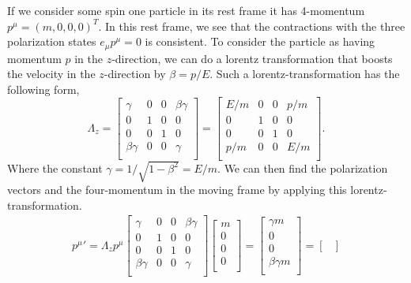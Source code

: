 \documentclass[working, oneside]{../../../Preambles/tuftebook}
\begin{document}
\begin{solution}
If we consider some spin one particle in its rest frame it has 4-momentum $p^{\mu } = \left( m, 0, 0, 0 \right) ^{T}$. In this rest frame, we see that the contractions with the three polarization states $e_{\mu }p^{\mu } = 0$ is consistent. To consider the particle as having momentum $p$ in the $z$-direction, we can do a lorentz transformation that boosts the velocity in the $z$-direction by $\beta= p /E$. Such a lorentz-transformation has the following form,
\[
\Lambda_z =
\begin{bmatrix}
    \gamma & 0 & 0 & \beta\gamma \\
    0 & 1 & 0 & 0 \\
    0 & 0 & 1 & 0 \\
    \beta\gamma & 0 & 0& \gamma \\
\end{bmatrix} =
\begin{bmatrix}
    E /m & 0 & 0 & p /m \\
    0 & 1 & 0 & 0 \\
    0 & 0 & 1 & 0 \\
    p /m & 0 & 0& E /m \\
\end{bmatrix}
.\] 
Where the constant $\gamma = 1 /\sqrt{1 - \beta^2} = E /m $. We can then find the polarization vectors and the four-momentum in the moving frame by applying this lorentz-transformation.
\begin{align*}
    p^{\mu}' = \Lambda_z p^{\mu }
\begin{bmatrix}
    \gamma & 0 & 0 & \beta\gamma \\
    0 & 1 & 0 & 0 \\
    0 & 0 & 1 & 0 \\
    \beta\gamma & 0 & 0& \gamma \\
\end{bmatrix}
\begin{bmatrix}
     m \\
    0 \\
    0 \\
      0 \\
\end{bmatrix}
= 
\begin{bmatrix}
    \gamma m \\
    0 \\
    0 \\
    \beta \gamma m \\
\end{bmatrix}
= 
\begin{bmatrix}

\end{bmatrix}
\end{align*}
\end{solution}
\end{document}
